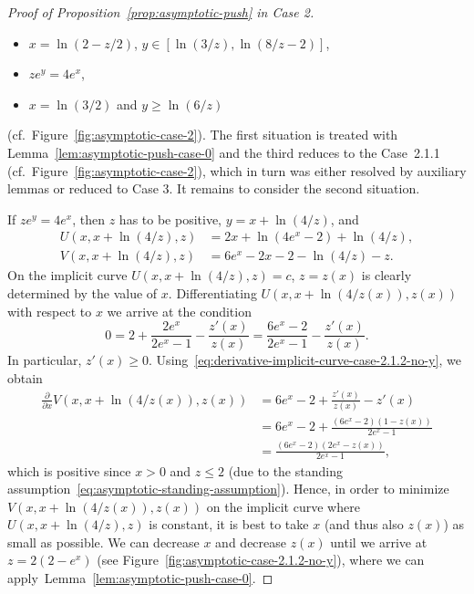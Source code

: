 \documentclass[a4paper]{amsart} %
\theoremstyle{definition}
\theoremstyle{remark}
\numberwithin{equation}{section}
\newcommand*{\XXXasymptoticDenominator}{V}
\newcommand*{\XXXasymptoticNominator}{U}
\begin{document}
\begin{proof}[Proof of Proposition~\ref{prop:asymptotic-push} in Case 2]
	\begin{itemize}
		\item $x=\ln(2-z/2)$, $y\in[\ln(3/z), \ln(8/z -2)]$,
		\item $ze^y = 4e^x$,
		\item $x = \ln(3/2)$ and $y\geq \ln(6/z)$
	\end{itemize}
		(cf.~Figure~\ref{fig:asymptotic-case-2}).
		The first situation is treated with Lemma~\ref{lem:asymptotic-push-case-0} and the third reduces to the Case~2.1.1 (cf.\ Figure~\ref{fig:asymptotic-case-2}), which in turn was either resolved by auxiliary lemmas or reduced to Case 3.
	It remains to consider the second situation.
	
	If $ze^y = 4e^x$, then $z$ has to be positive, $y = x + \ln(4/z)$,
	and
	\begin{align*}
	\XXXasymptoticNominator(x,x + \ln(4/z), z)   &= 2x + \ln(4e^x-2) + \ln(4/z),\\
	\XXXasymptoticDenominator(x,x+\ln(4/z), z) &= 6e^x - 2x - 2 - \ln(4/z)  - z.
	\end{align*}
	On the implicit curve $\XXXasymptoticNominator(x,x + \ln(4/z), z) = c $,
	$z = z(x)$ is clearly determined by the value of $x$.
	Differentiating  $\XXXasymptoticNominator(x,x + \ln(4/z(x)), z(x))$
	with respect to $x$ we arrive at the condition
	\begin{equation}
	\label{eq:derivative-implicit-curve-case-2.1.2-no-y}
	0 = 2 + \frac{2e^x}{2e^x - 1} -\frac{z'(x)}{z(x)} 
	= \frac{6e^x - 2 }{2e^x - 1} -\frac{z'(x)}{z(x)}.
	\end{equation}
	In particular, $z'(x) \geq 0$.
	Using~\eqref{eq:derivative-implicit-curve-case-2.1.2-no-y}, we obtain
	\begin{align*}
	\frac{\partial }{\partial x} \XXXasymptoticDenominator(x,x+\ln(4/z(x)), z(x)) 
	&= 6e^x - 2  + \frac{z'(x)}{z(x)} - z'(x)
	\\ %
	&=     6e^x - 2  + \frac{(6 e^x - 2)(1-z(x))}{2e^x - 1}\\
	&= \frac{(6 e^x - 2)(2 e^x -z(x))}{2e^x - 1}, 
	\end{align*}
	which is positive since $x >0$ and $z\leq 2$ (due to the standing assumption~\eqref{eq:asymptotic-standing-assumption}).
	Hence, in order to minimize $\XXXasymptoticDenominator(x,x+\ln(4/z(x)), z(x))$
	on the implicit curve where $\XXXasymptoticNominator(x,x + \ln(4/z), z)$ is constant,
	it is best to take $x$ (and thus also $z(x)$) as small as possible.
	We can decrease $x$ and decrease $z(x)$ until we arrive at $z= 2(2-e^x)$  (see Figure~\ref{fig:asymptotic-case-2.1.2-no-y}), where we can apply~Lemma~\ref{lem:asymptotic-push-case-0}.
	

\end{proof}
\end{document}
